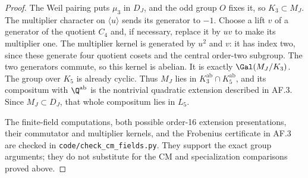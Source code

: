 \begin{proof}
The Weil pairing puts $\mu_3$ in $D_J$, and the odd group $O$
fixes it, so $K_3\subset M_J$. The multiplier character on
$\langle u\rangle$ sends its generator to $-1$. Choose a lift
$v$ of a generator of the quotient $C_4$ and, if necessary,
replace it by $uv$ to make its multiplier one. The multiplier
kernel is generated by $u^2$ and $v$: it has index two, since
these generate four quotient cosets and the central order-two
subgroup. The two generators commute, so this kernel is abelian.
It is exactly $\Gal(M_J/K_3)$. The group over $K_5$ is already
cyclic. Thus $M_J$ lies in $K_3^{\mathrm{ab}}\cap K_5^{\mathrm{ab}}$,
and its compositum with $\Q^{\mathrm{ab}}$ is the nontrivial
quadratic extension described in AF.3. Since $M_J\subset D_J$,
that whole compositum lies in $L_5$.

The finite-field computations, both possible order-16 extension
presentations, their commutator and multiplier kernels, and the
Frobenius certificate in AF.3 are checked in
\texttt{code/check\_cm\_fields.py}. They support the exact group
arguments; they do not substitute for the CM and specialization
comparisons proved above.
\end{proof}

